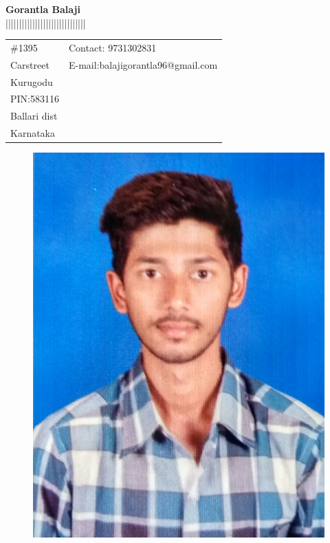 \documentclass[10pt]{article}
\begin{document}
\huge{\textbf{\hspace{1.7in}Gorantla Balaji}} \\
||||||||||||||||||||||||||||||
\centering 
\thispagestyle{empty}
\large{\vspace{.05in}
\begin{tabular}{@{}p{3.5in}p{3in}}
\#1395            & \hspace{1.0cm} {Contact:}  9731302831 \\
Carstreet
 & \hspace{1cm}
  {E-mail:}\hspace{1.4mm}balajigorantla96@gmail.com\\
Kurugodu\\
PIN:583116 & {}\\
Ballari dist\\
Karnataka


\end{tabular}
}

 \begin{figure}[h]
\hspace{4.2in}\includegraphics[scale=0.06]{IMG_20170423_160215.jpg}
\end{figure}
\end{document}
